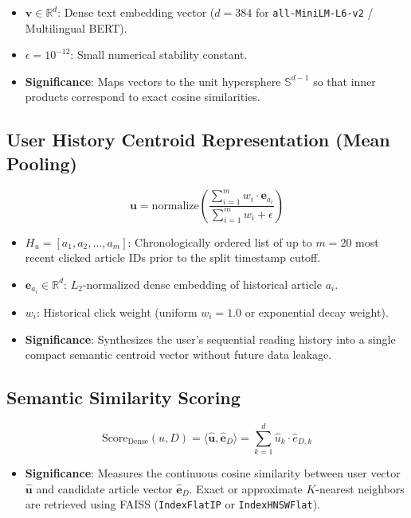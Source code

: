 \documentclass[11pt,a4paper]{article}
\begin{document}
\begin{itemize}
  \item $\mathbf{v} \in \mathbb{R}^d$: Dense text embedding vector ($d = 384$ for \texttt{all-MiniLM-L6-v2} / Multilingual BERT).
  \item $\epsilon = 10^{-12}$: Small numerical stability constant.
  \item \textbf{Significance}: Maps vectors to the unit hypersphere $\mathbb{S}^{d-1}$ so that inner products correspond to exact cosine similarities.
\end{itemize}

\subsection{User History Centroid Representation (Mean Pooling)}
\begin{equation}
\mathbf{u} = \text{normalize}\left(\frac{\sum_{i=1}^m w_i \cdot \mathbf{e}_{a_i}}{\sum_{i=1}^m w_i + \epsilon}\right)
\end{equation}

\begin{itemize}
  \item $H_u = [a_1, a_2, \dots, a_m]$: Chronologically ordered list of up to $m = 20$ most recent clicked article IDs prior to the split timestamp cutoff.
  \item $\mathbf{e}_{a_i} \in \mathbb{R}^d$: $L_2$-normalized dense embedding of historical article $a_i$.
  \item $w_i$: Historical click weight (uniform $w_i = 1.0$ or exponential decay weight).
  \item \textbf{Significance}: Synthesizes the user's sequential reading history into a single compact semantic centroid vector without future data leakage.
\end{itemize}

\subsection{Semantic Similarity Scoring}
\begin{equation}
\text{Score}_{\text{Dense}}(u, D) = \langle \mathbf{\hat{u}}, \mathbf{\hat{e}}_D \rangle = \sum_{k=1}^d \hat{u}_k \cdot \hat{e}_{D, k}
\end{equation}

\begin{itemize}
  \item \textbf{Significance}: Measures the continuous cosine similarity between user vector $\mathbf{\hat{u}}$ and candidate article vector $\mathbf{\hat{e}}_D$. Exact or approximate $K$-nearest neighbors are retrieved using FAISS (\texttt{IndexFlatIP} or \texttt{IndexHNSWFlat}).
\end{itemize}
\end{document}
